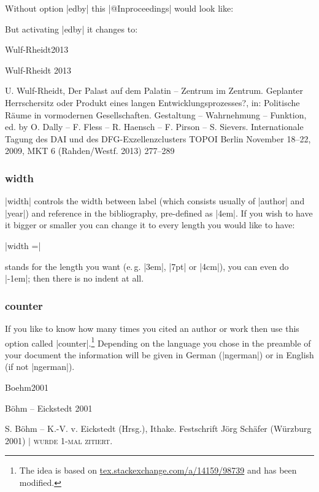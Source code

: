 \documentclass[a4paper,
10pt,
greek,
french,
spanish,
italian,
ngerman,
english,
]{ltxdoc}
\begin{document}
Without option |edby| this |@Inproceedings| would look like:
 

But activating |edby| it changes to:

\begin{bibbox}{Wulf-Rheidt2013}\footnotesize
\parbox[t]{2.3cm}{Wulf-Rheidt 2013} \parbox[t]{9cm}{%
U. Wulf-Rheidt, Der Palast auf dem Palatin – Zentrum im Zentrum. Geplanter Herrschersitz oder Produkt eines langen Entwicklungsprozesses?, in:  {\color{red}Politische Räume in vormodernen Gesellschaften. Gestaltung – Wahrnehmung – Funktion, ed. by O. Dally – F. Fless – R. Haensch – F. Pirson – S. Sievers}. Internationale Tagung des DAI und des DFG-Exzellenzclusters TOPOI Berlin November 18–22, 2009, MKT 6 (Rahden/Westf. 2013) 277–289}
\end{bibbox}
 
 
\subsubsection{width}\label{width}
|width| controls the width between label (which consists usually of |author| and |year|) and reference in the bibliography, pre-defined as |4em|.
If you wish to have it bigger or smaller you can change it to every length you would like to have:

|width =| 

 stands for the length you want (e.\,g. |3em|, |7pt| or |4cm|), you can even do |-1em|; 
then there is no indent at all.

\subsubsection{counter}\label{counter}
If you like to know how many times you cited an author or work then use this option called |counter|.\footnote{The idea is based on \href{http://tex.stackexchange.com/a/14159/98739}{tex.stackexchange.com/a/14159/98739} and has been modified.} 
Depending on the language you chose in the preamble of your document the information will be given in German (|ngerman|) or in English (if not |ngerman|).

\begin{bibbox}{Boehm2001}\footnotesize
\parbox[t]{3cm}{Böhm – Eickstedt 2001} \parbox[t]{8cm}{%
S. Böhm – K.-V. v. Eickstedt (Hrsg.), Ithake. Festschrift Jörg Schäfer (Würzburg 2001)  $\vert$  {\scshape  wurde 1-mal zitiert.}}
\end{bibbox}
\end{document}
